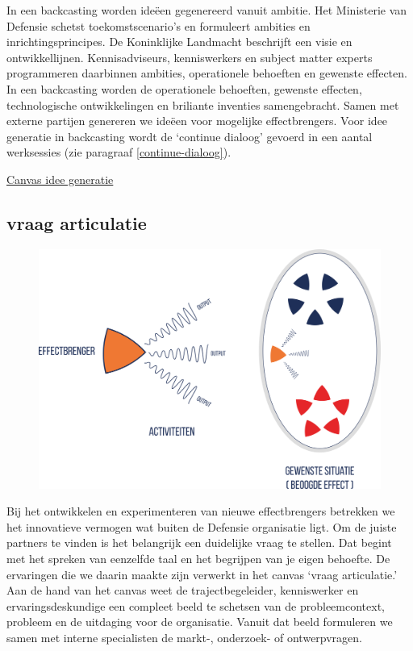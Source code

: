 \documentclass[
]{book}
\begin{document}
In een backcasting worden ideëen gegenereerd vanuit ambitie. Het Ministerie van Defensie schetst toekomstscenario's en formuleert ambities en inrichtingsprincipes. De Koninklijke Landmacht beschrijft een visie en ontwikkellijnen. Kennisadviseurs, kenniswerkers en subject matter experts programmeren daarbinnen ambities, operationele behoeften en gewenste effecten. In een backcasting worden de operationele behoeften, gewenste effecten, technologische ontwikkelingen en briliante inventies samengebracht. Samen met externe partijen genereren we ideëen voor mogelijke effectbrengers. Voor idee generatie in backcasting wordt de `continue dialoog' gevoerd in een aantal werksessies (zie paragraaf \ref{continue-dialoog}).

\href{data/images/20200116-CDE-canvassen-ideegeneratie.svg}{Canvas idee generatie}

\hypertarget{vraag-articulatie}{%
\subsection{vraag articulatie}\label{vraag-articulatie}}

\begin{figure}
\includegraphics[width=450pt]{data/images/20210324-MDI-effectbrenger-ei} \caption{ }\label{fig:unnamed-chunk-19}
\end{figure}

Bij het ontwikkelen en experimenteren van nieuwe effectbrengers betrekken we het innovatieve vermogen wat buiten de Defensie organisatie ligt. Om de juiste partners te vinden is het belangrijk een duidelijke vraag te stellen. Dat begint met het spreken van eenzelfde taal en het begrijpen van je eigen behoefte. De ervaringen die we daarin maakte zijn verwerkt in het canvas `vraag articulatie.' Aan de hand van het canvas weet de trajectbegeleider, kenniswerker en ervaringsdeskundige een compleet beeld te schetsen van de probleemcontext, probleem en de uitdaging voor de organisatie. Vanuit dat beeld formuleren we samen met interne specialisten de markt-, onderzoek- of ontwerpvragen.
\end{document}
